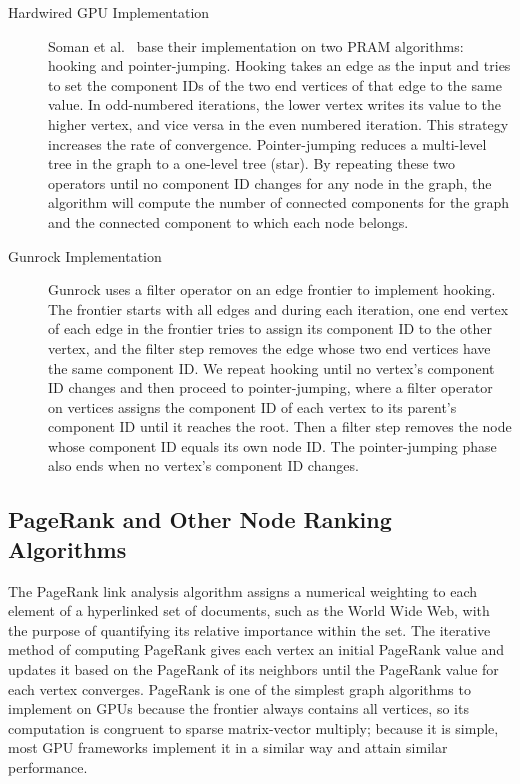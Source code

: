 \documentclass[format=acmsmall,review=false,screen=true]{acmart}
\begin{document}
\begin{description}
\item[Hardwired GPU Implementation] Soman et
  al.~ base their implementation on two PRAM
  algorithms: hooking and pointer-jumping. Hooking takes an edge as
  the input and tries to set the component IDs of the two end vertices
  of that edge to the same value. In odd-numbered iterations, the
  lower vertex writes its value to the higher vertex, and vice versa
  in the even numbered iteration. This strategy increases the rate of
  convergence. Pointer-jumping reduces a multi-level tree in the graph
  to a one-level tree (star). By repeating these two operators until
  no component ID changes for any node in the graph, the algorithm
  will compute the number of connected components for the graph and
  the connected component to which each node belongs.

\item[Gunrock Implementation] Gunrock uses a filter operator on an
  edge frontier to implement hooking. The frontier starts with all
  edges and during each iteration, one end vertex of each edge in the
  frontier tries to assign its component ID to the other vertex, and
  the filter step removes the edge whose two end vertices have the
  same component ID\@. We repeat hooking until no vertex's component
  ID changes and then proceed to pointer-jumping, where a filter
  operator on vertices assigns the component ID of each vertex to its
  parent's component ID until it reaches the root. Then a filter step
  removes the node whose component ID equals its own node ID\@. The
  pointer-jumping phase also ends when no vertex's component ID
  changes.
\end{description}

\subsection{PageRank and Other Node Ranking Algorithms}

The PageRank link analysis algorithm assigns a numerical weighting to
each element of a hyperlinked set of documents, such as the World Wide
Web, with the purpose of quantifying its relative importance within
the set. The iterative method of computing PageRank gives each vertex
an initial PageRank value and updates it based on the PageRank of its
neighbors until the PageRank value for each vertex converges.
PageRank is one of the simplest graph algorithms to implement on GPUs
because the frontier always contains all vertices, so its computation
is congruent to sparse matrix-vector multiply; because it is simple,
most GPU frameworks implement it in a similar way and attain similar
performance.
\end{document}
